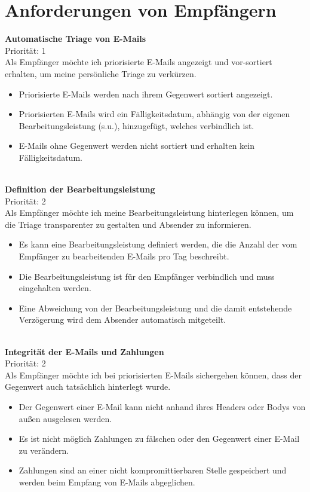 \section{Anforderungen von Empfängern}
\label{Anforderungen_von_Empfaengern}


\textbf{Automatische Triage von E-Mails} \\
Priorität: 1 \\
Als Empfänger möchte ich priorisierte E-Mails angezeigt und vor-sortiert erhalten, um meine persönliche Triage zu verkürzen.
\begin{itemize}
    \item Priorisierte E-Mails werden nach ihrem Gegenwert sortiert angezeigt.
    \item Priorisierten E-Mails wird ein Fälligkeitsdatum, abhängig von der eigenen Bearbeitungsleistung (s.u.), hinzugefügt, welches verbindlich ist.
    \item E-Mails ohne Gegenwert werden nicht sortiert und erhalten kein Fälligkeitsdatum.
\end{itemize}

\noindent
\\ \textbf{Definition der Bearbeitungsleistung} \\
Priorität: 2 \\
Als Empfänger möchte ich meine Bearbeitungsleistung hinterlegen können, um die Triage transparenter zu gestalten und Absender zu informieren.
\begin{itemize}
    \item Es kann eine Bearbeitungsleistung definiert werden, die die Anzahl der vom Empfänger zu bearbeitenden E-Mails pro Tag beschreibt.
    \item Die Bearbeitungsleistung ist für den Empfänger verbindlich und muss eingehalten werden.
    \item Eine Abweichung von der Bearbeitungsleistung und die damit entstehende Verzögerung wird dem Absender automatisch mitgeteilt.
\end{itemize}

\noindent
\\ \textbf{Integrität der E-Mails und Zahlungen} \\
Priorität: 2 \\
Als Empfänger möchte ich bei priorisierten E-Mails sichergehen können, dass der  Gegenwert auch tatsächlich hinterlegt wurde.
\begin{itemize}
    \item Der Gegenwert einer E-Mail kann nicht anhand ihres Headers oder Bodys von außen ausgelesen werden.
    \item Es ist nicht möglich Zahlungen zu fälschen oder den Gegenwert einer E-Mail zu verändern.
    \item Zahlungen sind an einer nicht kompromittierbaren Stelle gespeichert und werden beim Empfang von E-Mails abgeglichen.
\end{itemize}

